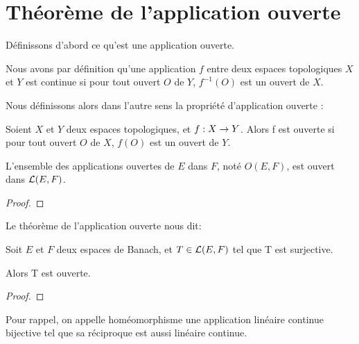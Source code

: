 \chapter{Théorème de l'application ouverte}

Définissons d'abord ce qu'est une application ouverte.

Nous avons par définition qu'une application $f$ entre deux espaces topologiques
$X$ et $Y$ est continue si pour tout ouvert $O$ de $Y$, $f^{-1}(O)$ est un
ouvert de $X$.

Nous définissons alors dans l'autre sens la propriété d'application ouverte :

\begin{definition}
	Soient $X$ et $Y$ deux espaces topologiques, et $f : X \rightarrow Y$. Alors
	f est ouverte si pour tout ouvert $O$ de $X$, $f(O)$ est un ouvert de $Y$.
\end{definition}


%

\begin{proposition}
	L'ensemble des applications ouvertes de $E$ dans $F$, noté $O(E, F)$, est
	ouvert dans $\mathcal{L}(E, F)$.
\end{proposition}

\ifdefined\outputproof
\begin{proof}

\end{proof}
\fi

Le théorème de l'application ouverte nous dit:

\begin{theorem} 
\label{theorem_open_application}
	Soit $E$ et $F$ deux espaces de Banach, et $T \in \mathcal{L}(E, F)$ tel
	que T est surjective.

	Alors T est ouverte.
\end{theorem}

\ifdefined\outputproof
\begin{proof}

\end{proof}
\fi

Pour rappel, on appelle homéomorphisme une application linéaire continue bijective
tel que sa réciproque est aussi linéaire continue.

